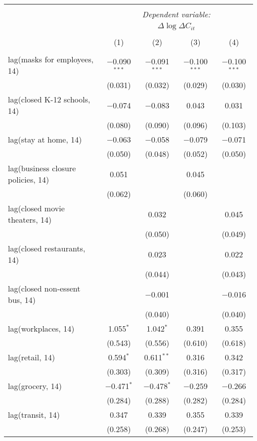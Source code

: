 \begin{tabular}{@{\extracolsep{1pt}}lcccc} 
\\[-1.8ex]\hline 
\hline \\[-1.8ex] 
 & \multicolumn{4}{c}{\textit{Dependent variable:}} \\ 
\cline{2-5} 
 & \multicolumn{4}{c}{$\Delta \log \Delta C_{it}$} \\ 
\\[-1.8ex] & (1) & (2) & (3) & (4)\\ 
\hline \\[-1.8ex] 
 lag(masks for employees, 14) & $-$0.090$^{***}$ & $-$0.091$^{***}$ & $-$0.100$^{***}$ & $-$0.100$^{***}$ \\ 
  & (0.031) & (0.032) & (0.029) & (0.030) \\ 
  lag(closed K-12 schools, 14) & $-$0.074 & $-$0.083 & 0.043 & 0.031 \\ 
  & (0.080) & (0.090) & (0.096) & (0.103) \\ 
  lag(stay at home, 14) & $-$0.063 & $-$0.058 & $-$0.079 & $-$0.071 \\ 
  & (0.050) & (0.048) & (0.052) & (0.050) \\ 
  lag(business closure policies, 14) & 0.051 &  & 0.045 &  \\ 
  & (0.062) &  & (0.060) &  \\ 
  lag(closed movie theaters, 14) &  & 0.032 &  & 0.045 \\ 
  &  & (0.050) &  & (0.049) \\ 
  lag(closed restaurants, 14) &  & 0.023 &  & 0.022 \\ 
  &  & (0.044) &  & (0.043) \\ 
  lag(closed non-essent bus, 14) &  & $-$0.001 &  & $-$0.016 \\ 
  &  & (0.040) &  & (0.040) \\ 
  lag(workplaces, 14) & 1.055$^{*}$ & 1.042$^{*}$ & 0.391 & 0.355 \\ 
  & (0.543) & (0.556) & (0.610) & (0.618) \\ 
  lag(retail, 14) & 0.594$^{*}$ & 0.611$^{**}$ & 0.316 & 0.342 \\ 
  & (0.303) & (0.309) & (0.316) & (0.317) \\ 
  lag(grocery, 14) & $-$0.471$^{*}$ & $-$0.478$^{*}$ & $-$0.259 & $-$0.266 \\ 
  & (0.284) & (0.288) & (0.282) & (0.284) \\ 
  lag(transit, 14) & 0.347 & 0.339 & 0.355 & 0.339 \\ 
  & (0.258) & (0.268) & (0.247) & (0.253) \\ 

\end{tabular}
